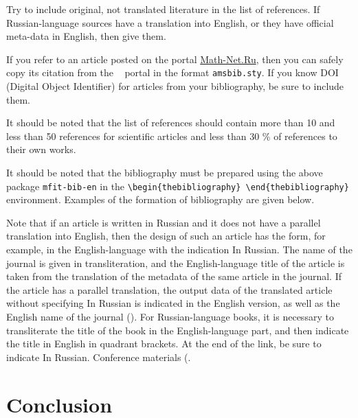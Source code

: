\documentclass{mfitjournal-en}%
\begin{document}
Try to include original, not translated literature in the list of references. If Russian-language sources have a translation into English, or they have official meta-data in English, then give them.

If you refer to an article posted on the portal \href{http://www.mathnet.ru/ej.phtml?option_lang=eng} {Math-Net.Ru}, then you can safely copy its citation from the ~ portal in the format {\tt amsbib.sty}. If you know DOI (Digital Object Identifier) for articles from your bibliography, be sure to include them.

\begin{engremark}[3]
It should be noted that the list of references should contain more than 10 and less than 50 references for scientific articles and less than 30 \% of references to their own works.
\end{engremark}

\begin{engremark}[4]
It should be noted that the bibliography must be prepared using the above package {\tt mfit-bib-en} in the \verb "\begin{thebibliography} \end{thebibliography}" environment. Examples of the formation of bibliography are given below.
\end{engremark}

\begin{engremark}[5]	
Note that if an article is written in Russian and it does not have a parallel translation into English, then the design of such an article has the form, for example, in the English-language \cite{Jur20} with the indication In Russian. The name of the journal is given in transliteration, and the English-language title of the article is taken from the translation of the metadata of the same article in the journal. If the article has a parallel translation, the output data of the translated article without specifying In Russian is indicated in the English version, as well as the English name of the journal (\cite{Parovik2015}). For Russian-language books, it is necessary to transliterate the title of the book in the English-language part, and then indicate the title in English in quadrant brackets. At the end of the link, be sure to indicate In Russian. Conference materials (\cite{Alikhanov}.
\end{engremark}

\section*{Conclusion}
\end{document}
